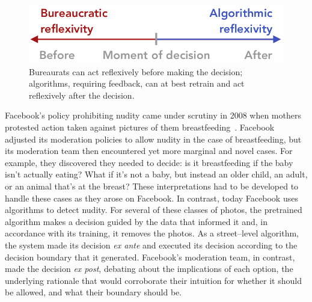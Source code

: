 \documentclass[street-level_algorithms]{subfiles}
\begin{document}
\begin{figure}
  \centering
  \includegraphics[width=\columnwidth]{figures/timeline.png}
  \caption{Bureaurats can act reflexively before making the decision; algorithms, requiring feedback, can at best retrain and act reflexively after the decision.\vspace{-0.5em}}
  \label{fig:timeline}
\end{figure}

Facebook's policy prohibiting nudity came under scrutiny
in 2008 when mothers protested action taken against
pictures of them breastfeeding~\cite{ibrahim2010breastfeeding}.
Facebook adjusted its moderation policies
to allow nudity in the case of breastfeeding, but
its moderation team then encountered yet more marginal and novel cases.
For example, they discovered they needed to decide:
is it breastfeeding if the baby isn't actually eating?
What if it's not a baby, but instead an older child, an adult, or an animal that's at the breast?
These interpretations had to be developed to handle these cases as they arose on Facebook.
In contrast, today Facebook uses algorithms to detect nudity.
For several of these classes of photos,
the pretrained algorithm makes a decision guided by the data that informed it and,
in accordance with its training, it removes the photos.
As a street--level algorithm,
the system made its decision \textit{ex ante} and executed its decision according to the decision boundary that it generated.
Facebook's moderation team, in contrast, made the decision \textit{ex post},
debating about the implications of each option,
the underlying rationale that would corroborate their intuition for whether it should be allowed, and
what their boundary should be.


%   
%   
\end{document}
